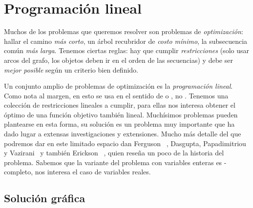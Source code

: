 

\chapter{Programación lineal}
\label{cha:programacion-lineal}

  Muchos de los problemas que queremos resolver
  son problemas de \emph{optimización}:
  hallar el camino \emph{más corto},
  un árbol recubridor de \emph{costo mínimo},
  la subsecuencia común \emph{más larga}.
  Tenemos ciertas reglas:
  hay que cumplir \emph{restricciones}
  (solo usar arcos del grafo,
   los objetos deben ir en el orden de las secuencias)
  y debe ser \emph{mejor posible} según un criterio bien definido.

  Un conjunto amplio de problemas de optimización
  es la \emph{programación lineal}.
  Como nota al margen,
  en esto 
  se usa en el sentido de  o ,
  no .
  Tenemos una colección de restricciones lineales a cumplir,
  para ellas nos interesa obtener el óptimo de una función objetivo
  también lineal.
  Muchísimos problemas pueden plantearse en esta forma,
  su solución es un problema muy importante
  que ha dado lugar a extensas investigaciones y extensiones.
  Mucho más detalle del que podremos dar en este limitado espacio
  dan Ferguson~%
    \cite{ferguson15:_linear_programming},
  Dasgupta, Papadimitriou y Vazirani~%
    \cite[capítulo~7]{dasgupta06:_algorithms}
  y también Erickson~%
    \cite{erickson19:_algorithms},
  quien reseña un poco de la historia del problema.
  Sabemos que la variante del problema con variables
  enteras es \NP\nobreakdash-completo,
  nos interesa el caso de variables reales.

\section{Solución gráfica}
\label{sec:solucion-grafica}

